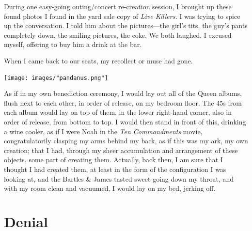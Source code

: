 \documentclass[
]{memoir}
\begin{document}
During one easy-going outing/concert re-creation session, I brought up
these found photos I found in the yard sale copy of \emph{Live Killers.}
I was trying to spice up the conversation. I told him about the
pictures---the girl's tits, the guy's pants completely down, the smiling
pictures, the coke. We both laughed. I excused myself, offering to buy
him a drink at the bar.

When I came back to our seats, my recollect or muse had gone.

\begin{center}\texttt{[image: images/"pandanus.png"]}\end{center}

As if in my own benediction ceremony, I would lay out all of the Queen
albums, flush next to each other, in order of release, on my bedroom
floor. The 45s from each album would lay on top of them, in the lower
right-hand corner, also in order of release, from bottom to top. I would
then stand in front of this, drinking a wine cooler, as if I were Noah
in the \emph{Ten Commandments} movie, congratulatorily clasping my arms
behind my back, as if this was my ark, my own creation; that I had,
through my sheer accumulation and arrangement of these objects, some
part of creating them. Actually, back then, I am sure that I thought I
had created them, at least in the form of the configuration I was
looking at, and the Bartles \& James tasted sweet going down my throat,
and with my room clean and vacuumed, I would lay on my bed, jerking off.

\hypertarget{denial}{%
\section*{Denial}\label{denial}}
\end{document}
